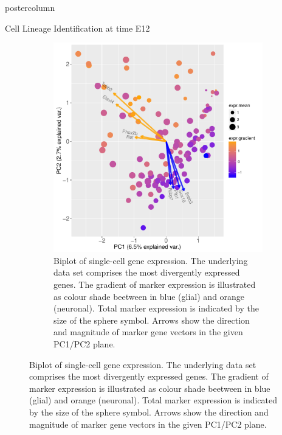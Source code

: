 \documentclass{beamer}
\begin{document}
\begin{frame}
\begin{columns}
\begin{column}{.45\textwidth}
\begin{beamercolorbox}[center]{postercolumn}
\begin{minipage}{.98\textwidth}
{\begin{myblock}{Cell Lineage Identification at time E12}
\begin{figure}
\begin{figure}
\begin{minipage}{0.45\textwidth}
	\centering\includegraphics[width=1.0\textwidth]{./biplot_semisuperv.pdf}
	\caption{Biplot of single-cell gene expression. The underlying data set
		comprises the most divergently expressed genes. The gradient of marker
		expression is illustrated as colour shade beetween in blue (glial) and
		orange (neuronal).
		Total marker expression is indicated by the size of the sphere symbol.
		Arrows show the direction and magnitude of marker gene vectors
		in the given PC1/PC2 plane.}
	\label{fig:biplot}
\end{minipage}


\end{figure}
\end{figure}
\end{myblock}}
\end{minipage}
\end{beamercolorbox}
\end{column}
\end{columns}
\end{frame}
\end{document}
